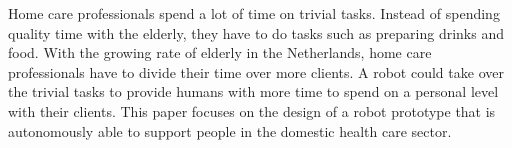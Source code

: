 \documentclass[project_eva.tex]{subfiles}
\begin{document}
Home care professionals spend a lot of time on trivial tasks. Instead of spending quality time with the elderly, they have to do tasks such as preparing drinks and food. With the growing rate of elderly in the Netherlands\cite{CBS}, home care professionals have to divide their time over more clients. A robot could take over the trivial tasks to provide humans with more time to spend on a personal level with their clients.
This paper focuses on the design of a robot prototype that is autonomously able to support people in the domestic health care sector. 
\end{document}
